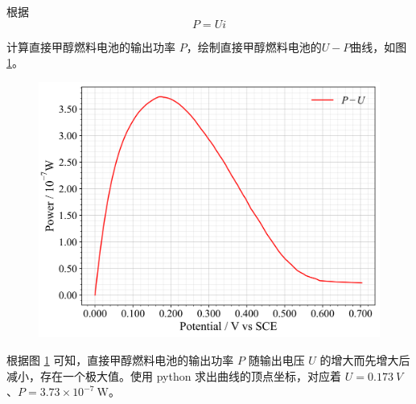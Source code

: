 根据
$$
P=U i
$$

计算直接甲醇燃料电池的输出功率 $P$，绘制直接甲醇燃料电池的$U-P$曲线，如图 \ref{fig:8}。

\begin{figure}[htbp]
    \centering
    \includegraphics[width=.75\textwidth]{figures2/8.png}
    \label{fig:8}
\end{figure}

根据图 \ref{fig:8} 可知，直接甲醇燃料电池的输出功率 $P$ 随输出电压 $U$ 的增大而先增大后减小，存在一个极大值。使用 python 求出曲线的顶点坐标，对应着 $U = \SI{0.173}{V}$、$P=3.73\times 10^{-7}\mathrm{~W}$。
















